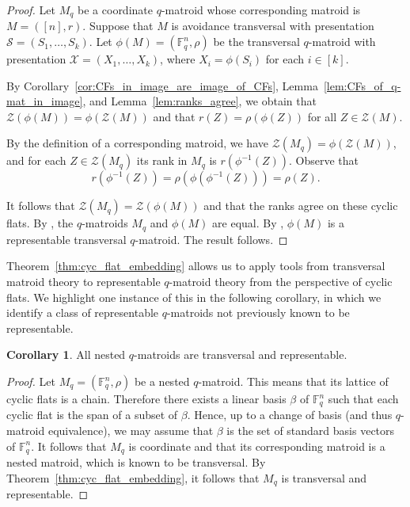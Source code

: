 \documentclass{article}
\theoremstyle{definition}
\newtheorem{corollary}[theorem]{{{Corollary}}}
\begin{document}
\begin{proof}
    Let $M_q$ be a coordinate $q$-matroid whose corresponding matroid is $M=([n],r)$. Suppose that $M$ is avoidance transversal with presentation $\mathcal{S}=(S_1,\dots,S_k)$. Let $\phi(M)=(\mathbb{F}_q^n,\rho)$ be the transversal $q$-matroid with presentation $\mathcal{X}=(X_1,\dots,X_k)$, where $X_i=\phi(S_i)$ for each $i\in[k]$.

    By Corollary~\ref{cor:CFs_in_image_are_image_of_CFs}, Lemma~\ref{lem:CFs_of_q-mat_in_image}, and Lemma~\ref{lem:ranks_agree}, we obtain that $\mathcal{Z}(\phi(M))=\phi(\mathcal{Z}(M))$ and that $r(Z)=\rho(\phi(Z))$ for all $Z\in\mathcal{Z}(M)$.

    By the definition of a corresponding matroid, we have $\mathcal{Z}(M_q)=\phi(\mathcal{Z}(M))$, and for each $Z\in\mathcal{Z}(M_q)$ its rank in $M_q$ is $r(\phi^{-1}(Z))$. Observe that
    \[
        r(\phi^{-1}(Z))
        =
        \rho(\phi(\phi^{-1}(Z)))
        =
        \rho(Z).
    \]

    It follows that $\mathcal{Z}(M_q)=\mathcal{Z}(\phi(M))$ and that the ranks agree on these cyclic flats. By \cite[Theorem 4.11]{AlfaranoByrne2024CyclicFlats}, the $q$-matroids $M_q$ and $\phi(M)$ are equal. By \cite[Theorem 24]{saaltink2025theoryqtransversals}, $\phi(M)$ is a representable transversal $q$-matroid. The result follows.
\end{proof}

Theorem~\ref{thm:cyc_flat_embedding} allows us to apply tools from transversal matroid theory to representable $q$-matroid theory from the perspective of cyclic flats. We highlight one instance of this in the following corollary, in which we identify a class of representable $q$-matroids not previously known to be representable.

\begin{corollary}
    All nested $q$-matroids are transversal and representable.
\end{corollary}

\begin{proof}
    Let $M_q=(\mathbb{F}_q^n,\rho)$ be a nested $q$-matroid. This means that its lattice of cyclic flats is a chain. Therefore there exists a linear basis $\beta$ of $\mathbb{F}_q^n$ such that each cyclic flat is the span of a subset of $\beta$. Hence, up to a change of basis (and thus $q$-matroid equivalence), we may assume that $\beta$ is the set of standard basis vectors of $\mathbb{F}_q^n$. It follows that $M_q$ is coordinate and that its corresponding matroid is a nested matroid, which is known to be transversal. By Theorem~\ref{thm:cyc_flat_embedding}, it follows that $M_q$ is transversal and representable.
\end{proof}
\end{document}
